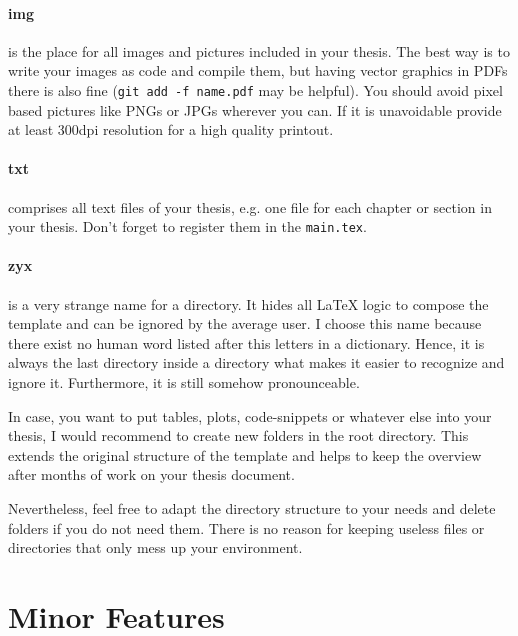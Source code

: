 \documentclass[../main.tex]{subfiles}
\begin{document}
\paragraph{img} is the place for all images and pictures included in your thesis.
The best way is to write your images as code and compile them, but having vector graphics in PDFs there is also fine (\texttt{git add -f name.pdf} may be helpful).
You should avoid pixel based pictures like PNGs or JPGs wherever you can.
If it is unavoidable provide at least 300dpi resolution for a high quality printout.

\paragraph{txt} comprises all text files of your thesis, e.g. one file for each chapter or section in your thesis.
Don't forget to register them in the \texttt{main.tex}.

\paragraph{zyx} is a very strange name for a directory.
It hides all LaTeX logic to compose the template and can be ignored by the average user.
I choose this name because there exist no human word listed after this letters in a dictionary.
Hence, it is always the last directory inside a directory what makes it easier to recognize and ignore it.
Furthermore, it is still somehow pronounceable.

In case, you want to put tables, plots, code-snippets or whatever else into your thesis, I would recommend to create new folders in the root directory.
This extends the original structure of the template and helps to keep the overview after months of work on your thesis document.

Nevertheless, feel free to adapt the directory structure to your needs and delete folders if you do not need them.
There is no reason for keeping useless files or directories that only mess up your environment.

\newpage
\section{Minor Features}
\end{document}
